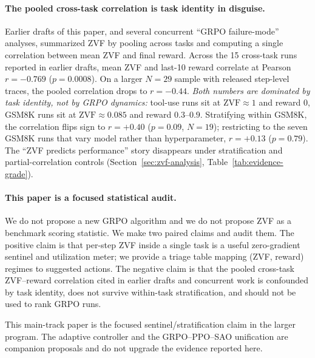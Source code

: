 \paragraph{The pooled cross-task correlation is task identity in disguise.}
Earlier drafts of this paper, and several concurrent ``GRPO failure-mode''
analyses, summarized ZVF by pooling across tasks and computing a single
correlation between mean ZVF and final reward. Across the 15 cross-task
runs reported in earlier drafts, mean ZVF and last-10 reward correlate at
Pearson $r{=}-0.769$ ($p{=}0.0008$). On a larger $N{=}29$ sample with
released step-level traces, the pooled correlation drops to $r{=}-0.44$.
\emph{Both numbers are dominated by task identity, not by GRPO dynamics:}
tool-use runs sit at $\mathrm{ZVF}{\approx}1$ and reward $0$, GSM8K runs
sit at $\mathrm{ZVF}{\approx}0.085$ and reward $0.3$--$0.9$. Stratifying
within GSM8K, the correlation flips sign to $r{=}+0.40$ ($p{=}0.09$,
$N{=}19$); restricting to the seven GSM8K runs that vary model rather than
hyperparameter, $r{=}+0.13$ ($p{=}0.79$). The ``ZVF predicts performance''
story disappears under stratification and partial-correlation controls
(Section~\ref{sec:zvf-analysis}, Table~\ref{tab:evidence-grade}).

\paragraph{This paper is a focused statistical audit.}
We do not propose a new GRPO algorithm and we do not propose ZVF as a
benchmark scoring statistic. We make two paired claims and audit them. The
positive claim is that per-step ZVF inside a single task is a useful
zero-gradient sentinel and utilization meter; we provide a triage table
mapping (ZVF, reward) regimes to suggested actions. The negative claim is
that the pooled cross-task ZVF--reward correlation cited in earlier drafts
and concurrent work is confounded by task identity, does not survive
within-task stratification, and should not be used to rank GRPO runs.

This main-track paper is the focused sentinel/stratification claim in the larger
program. The adaptive controller and the GRPO--PPO--SAO unification are companion
proposals and do not upgrade the evidence reported here.


